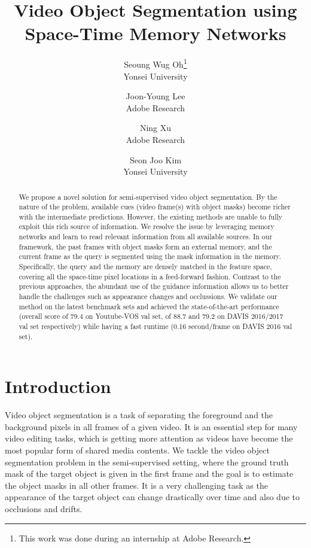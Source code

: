 \documentclass[10pt,twocolumn,letterpaper]{article}
\begin{document}
\title{Video Object Segmentation using Space-Time Memory Networks}

\author{
Seoung Wug Oh\thanks{This work was done during an internship at Adobe Research.}\\Yonsei University \and Joon-Young Lee\\Adobe Research \and  Ning Xu\\Adobe Research \and  Seon Joo Kim\\Yonsei University
}

\maketitle
\thispagestyle{empty}

\begin{abstract}
We propose a novel solution for semi-supervised video object segmentation. 
By the nature of the problem, available cues (\eg video frame(s) with object masks) become richer with the intermediate predictions.
However, the existing methods are unable to fully exploit this rich source of information.
We resolve the issue by leveraging memory networks and learn to read relevant information from all available sources. 
In our framework, the past frames with object masks form an external memory, and the current frame as the query is segmented using the mask information in the memory.
Specifically, the query and the memory are densely matched in the feature space, covering all the space-time pixel locations in a feed-forward fashion.
Contrast to the previous approaches, the abundant use of the guidance information allows us to better handle the challenges such as appearance changes and occlussions.
We validate our method on the latest benchmark sets and achieved the  
state-of-the-art performance (overall score of 79.4 on Youtube-VOS val set,  of 88.7 and 79.2 on DAVIS 2016/2017 val set respectively) while having a fast runtime (0.16 second/frame on DAVIS 2016 val set).


















\end{abstract}

\section{Introduction}
Video object segmentation is a task of separating the foreground and the background pixels in all frames of a given video. It is an essential step for many video editing tasks, which is getting more attention as videos have become the most popular form of shared media contents.
We tackle the video object segmentation problem in the semi-supervised setting, where the ground truth mask of the target object is given in the first frame and the goal is to estimate the object masks in all other frames.
It is a very challenging task as the appearance of the target object can change drastically over time and also due to occlusions and drifts. 
\end{document}
